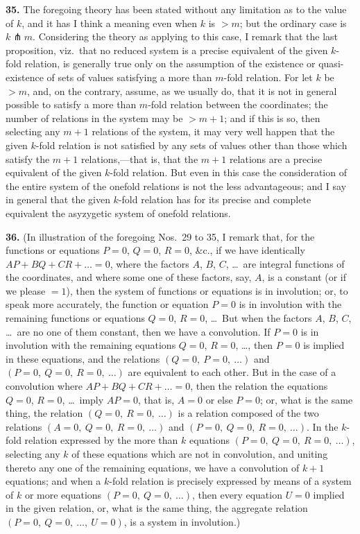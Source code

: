 \documentclass[11pt,a4paper]{article}
\theoremstyle{definition}
\begin{document}
\noindent\textbf{35.} The foregoing theory has been stated without any limitation as to the value of $k$, and it has I think a meaning even when $k$ is $>m$; but the ordinary case is $k\pitchfork m$. Considering the theory as applying to this case, I remark that the last proposition, viz.\ that no reduced system is a precise equivalent of the given $k$-fold relation, is generally true only on the assumption of the existence or quasi-existence of sets of values satisfying a more than $m$-fold relation. For let $k$ be $>m$, and, on the contrary, assume, as we usually do, that it is not in general possible to satisfy a more than $m$-fold relation between the coordinates; the number of relations in the system may be $>m+1$; and if this is so, then selecting any $m+1$ relations of the system, it may very well happen that the given $k$-fold relation is not satisfied by any sets of values other than those which satisfy the $m+1$ relations,---that is, that the $m+1$ relations are a precise equivalent of the given $k$-fold relation. But even in this case the consideration of the entire system of the onefold relations is not the less advantageous; and I say in general that the given $k$-fold relation has for its precise and complete equivalent the asyzygetic system of onefold relations.

\setcounter{page}{460}

\noindent\textbf{36.} (In illustration of the foregoing Nos.\ 29 to 35, I remark that, for the functions or equations $P=0$, $Q=0$, $R=0$, \&c., if we have identically $AP+BQ+CR+\ldots=0$, where the factors $A$, $B$, $C$, \ldots\ are integral functions of the coordinates, and where some one of these factors, say, $A$, is a constant (or if we please $=1$), then the system of functions or equations is in involution; or, to speak more accurately, the function or equation $P=0$ is in involution with the remaining functions or equations $Q=0$, $R=0$, \ldots\ But when the factors $A$, $B$, $C$, \ldots\ are no one of them constant, then we have a convolution. If $P=0$ is in involution with the remaining equations $Q=0$, $R=0$, \ldots, then $P=0$ is implied in these equations, and the relations $(Q=0,\ P=0,\ \ldots)$ and $(P=0,\ Q=0,\ R=0,\ \ldots)$ are equivalent to each other. But in the case of a convolution where $AP+BQ+CR+\ldots=0$, then the relation the equations $Q=0$, $R=0$, \ldots\ imply $AP=0$, that is, $A=0$ or else $P=0$; or, what is the same thing, the relation $(Q=0,\ R=0,\ \ldots)$ is a relation composed of the two relations $(A=0,\ Q=0,\ R=0,\ \ldots)$ and $(P=0,\ Q=0,\ R=0,\ \ldots)$. In the $k$-fold relation expressed by the more than $k$ equations $(P=0,\ Q=0,\ R=0,\ \ldots)$, selecting any $k$ of these equations which are not in convolution, and uniting thereto any one of the remaining equations, we have a convolution of $k+1$ equations; and when a $k$-fold relation is precisely expressed by means of a system of $k$ or more equations $(P=0,\ Q=0,\ \ldots)$, then every equation $U=0$ implied in the given relation, or, what is the same thing, the aggregate relation $(P=0,\ Q=0,\ \ldots,\ U=0)$, is a system in involution.)
\end{document}
